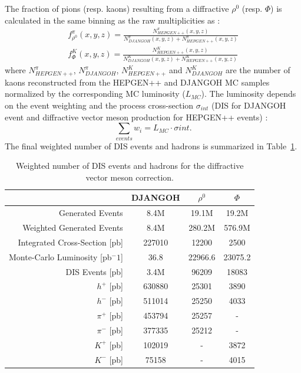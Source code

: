 The fraction of pions (resp. kaons) resulting from a diffractive $\rho^0$ (resp. $\Phi$) is calculated in the same binning as the raw multiplicities as :
%
\begin{equation}\label{eq:DVMhad}
  \begin{split}
    f^{\pi}_{\rho^0}(x,y,z) = \frac{N^{\pi}_{HEPGEN++}(x,y,z)}{N^{\pi}_{DJANGOH}(x,y,z)+N^{\pi}_{HEPGEN++}(x,y,z)} \\
    f^K_{\Phi}(x,y,z) = \frac{N^K_{HEPGEN++}(x,y,z)}{N^K_{DJANGOH}(x,y,z)+N^K_{HEPGEN++}(x,y,z)}
  \end{split}
\end{equation}
%
where $N^{\pi}_{HEPGEN++}$, $N^{\pi}_{DJANGOH}$, $N^K_{HEPGEN++}$ and $N^K_{DJANGOH}$ are the number of kaons reconstructed from the HEPGEN++ and DJANGOH MC samples normalized by the corresponding MC luminosity ($L_{MC}$). The luminosity depends on the event weighting and the process cross-section $\sigma_{int}$ (DIS for DJANGOH event and diffractive vector meson production for HEPGEN++ events) :
%
\begin{equation} \label{eq:reweight}
  \sum_{events} w_i = L_{MC} \cdot \sigma{int}.
\end{equation}
%
The final weighted number of DIS events and hadrons is summarized in Table~\ref{DVM}.

\begin{table}
	\centering
	\begin{tabular}{rccc}
    \hline
     & DJANGOH & $\rho^0$ & $\Phi$ \\
    \hline
    Generated Events & 8.4M & 19.1M & 19.2M  \\
    Weighted Generated Events & 8.4M & 280.2M & 576.9M  \\
		Integrated Cross-Section [pb] & 227010 & 12200 & 2500  \\
		Monte-Carlo Luminosity [pb$^-1$] & 36.8 & 22966.6 & 23075.2  \\
    \hline
		DIS Events [pb] & 3.4M & 96209 & 18083  \\
		$h^+$ [pb] & 630880 & 25301 & 3890  \\
		$h^-$ [pb] & 511014 & 25250 & 4033  \\
		$\pi^+$ [pb] & 453794 & 25257 & -  \\
		$\pi^-$ [pb] & 377335 & 25212 & -  \\
		$K^+$ [pb] & 102019 & - & 3872  \\
		$K^-$ [pb] & 75158 & - & 4015 \\
  \end{tabular}
  \caption{Weighted number of DIS events and hadrons for the diffractive vector meson correction.}
  \label{DVM}
\end{table}

